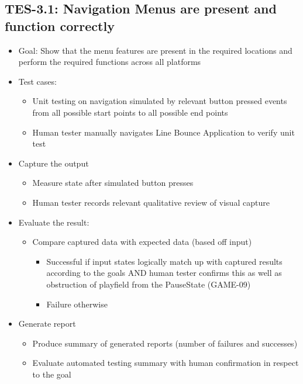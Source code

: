 \subsection{TES-3.1: Navigation Menus are present and function correctly }
\label{subsec:navmenu}
\begin{itemize}
\item Goal: Show that the menu features are present in the required locations
and perform the required functions across all platforms

\item Test cases: 
\begin{itemize}
\item Unit testing on navigation simulated by relevant button pressed events from all possible start points to all possible end points
\item Human tester manually navigates Line Bounce Application to verify unit test
\end{itemize}

\item Capture the output
\begin{itemize}
\item Measure state after simulated button presses
\item Human tester records relevant qualitative review of visual capture
\end{itemize}

\item Evaluate the result: 
\begin{itemize}
\item Compare captured data with expected data (based off input)
\begin{itemize}
\item Successful if input states logically match up with captured results according to the goals AND human tester confirms this as well as obstruction of playfield from the PauseState (GAME-09)
\item Failure otherwise
\end{itemize}
\end{itemize}

\item Generate report 
\begin{itemize}
\item Produce summary of generated reports (number of failures and successes)
\item Evaluate automated testing summary with human confirmation in respect to the goal
\end{itemize}
\end{itemize}

